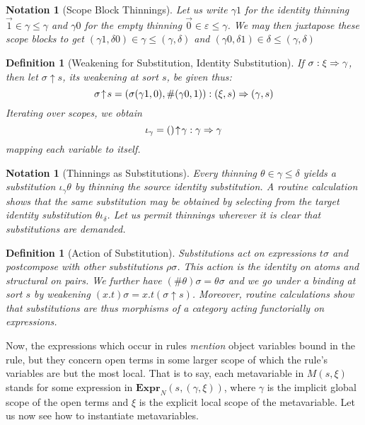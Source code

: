 \documentclass[format=acmsmall, screen, review, anonymous, timestamp]{acmart}
\newtheorem{defn}[thm]{Definition}
\newtheorem{notn}[thm]{Notation}
\newcommand{\emp}{\varepsilon}
\begin{document}
\begin{notn}[Scope Block Thinnings]
  Let us write $\gamma1$ for the identity thinning
  $\vec1\in\gamma\le\gamma$ and $\gamma0$ for the empty thinning
  $\vec0\in\emp\le\gamma$. We may then juxtapose these scope blocks to
  get $(\gamma1,\delta0) \in \gamma\le(\gamma,\delta)$ and
  $(\gamma0,\delta1) \in \delta\le(\gamma,\delta)$
\end{notn}

\newcommand{\wks}[2]{#1\!\uparrow\!#2}
\begin{defn}[Weakening for Substitution, Identity Substitution]
If $\sigma : \xi\Rightarrow\gamma$, then let $\wks\sigma s$, its
\emph{weakening} at sort $s$, be given thus:
\[
  \wks\sigma s = (\sigma(\gamma1,0), \#(\gamma0,1)) : (\xi,s)\Sb(\gamma,s)
\]
Iterating over scopes, we obtain
\[
  \iota_\gamma = \wks{()}{\gamma} : \gamma\Sb\gamma
\]
mapping each variable to itself.
\end{defn}

\begin{notn}[Thinnings as Substitutions]
  Every thinning $\theta\in \gamma\le\delta$ yields a substitution
  $\iota_\gamma\theta$ by thinning the source identity substitution. A
  routine calculation shows that the same substitution may be obtained
  by selecting from the target identity substitution
  $\theta\iota_\delta$.
  Let us permit thinnings wherever it is clear that
  substitutions are demanded.
\end{notn}

\begin{defn}[Action of Substitution]
Substitutions act on expressions $t\sigma$ and postcompose with other
substitutions $\rho\sigma$. This action is the identity on atoms and
structural on pairs. We further have $(\#\theta)\sigma = \theta\sigma$
and we go under a binding at sort $s$ by weakening
$(x.t)\sigma = x.t(\wks\sigma s)$.
Moreover, routine calculations show that substitutions are thus
morphisms of a \emph{category} acting \emph{functorially} on expressions. 
\end{defn}

Now, the expressions which occur in rules \emph{mention} object
variables bound in the rule, but they concern open terms in some
larger scope of which the rule's variables are but the most local.
That is to say, each metavariable in $M(s,\xi)$ stands for some
expression in $\textbf{Expr}_N(s,(\gamma,\xi))$, where $\gamma$ is the
implicit global scope of the open terms and $\xi$ is the explicit
local scope of the metavariable. Let us now see how to instantiate
metavariables.
\end{document}
